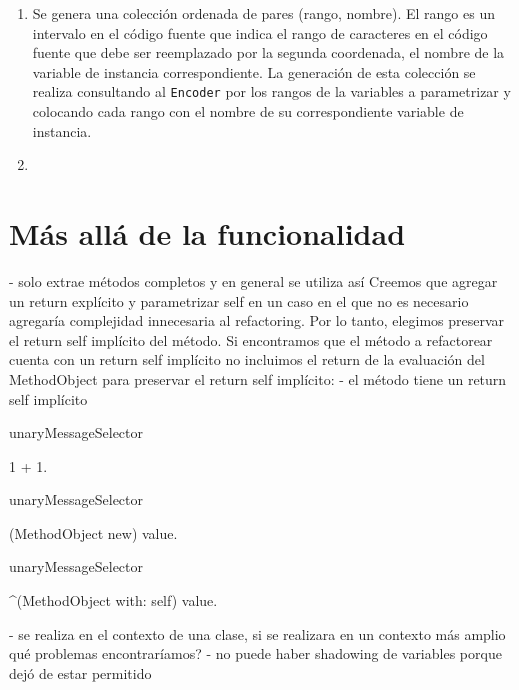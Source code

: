 \begin{enumerate}
    \item Se genera una colección ordenada de pares (rango, nombre). El rango es un intervalo en el
    código fuente que indica el rango de caracteres en el código fuente que debe ser reemplazado por
    la segunda coordenada, el nombre de la variable de instancia correspondiente. La generación de
    esta colección se realiza consultando al \lstinline{Encoder} por los rangos de la variables a
    parametrizar y colocando cada rango con el nombre de su correspondiente variable de instancia.
    \item 
\end{enumerate}






\section{Más allá de la funcionalidad}
- solo extrae métodos completos y en general se utiliza así
Creemos que agregar un return explícito y parametrizar self en un caso en el que no es necesario
agregaría complejidad innecesaria al refactoring. Por lo tanto, elegimos preservar el return self
implícito del método. Si encontramos que el método a refactorear cuenta con un return self implícito
no incluimos el return de la evaluación del MethodObject para preservar el return self implícito:
- el método tiene un return self implícito

\begin{code}

unaryMessageSelector

 1 + 1.

unaryMessageSelector
 
 (MethodObject new) value.

unaryMessageSelector

 ^(MethodObject with: self) value.

\end{code}

- se realiza en el contexto de una clase, si se realizara en un contexto más amplio qué problemas encontraríamos?
- no puede haber shadowing de variables porque dejó de estar permitido

